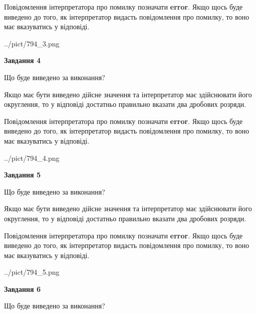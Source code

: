 \documentclass[12pt, ukrainian]{article}
\begin{document}
{\begin {Large}
Повідомлення інтерпретатора про помилку позначати \textbf{error}.
Якщо щось буде виведено до того, як інтерпретатор видасть повідомлення про помилку, 
то воно має вказуватись у відповіді. \par

\begin{center}
	{../pict/794_3.png}
\end{center}
\newpage

{\begin {center}\textbf{Завдання 4}\end {center}}\par
Що буде виведено за виконання? \par

Якщо має бути виведено дійсне значення та інтерпретатор має здійснювати його округлення, 
то у відповіді достатньо правильно вказати два дробових розряди.

Повідомлення інтерпретатора про помилку позначати \textbf{error}.
Якщо щось буде виведено до того, як інтерпретатор видасть повідомлення про помилку, 
то воно має вказуватись у відповіді. \par

\begin{center}
	{../pict/794_4.png}
\end{center}
\newpage

{\begin {center}\textbf{Завдання 5}\end {center}}\par
Що буде виведено за виконання? \par

Якщо має бути виведено дійсне значення та інтерпретатор має здійснювати його округлення, 
то у відповіді достатньо правильно вказати два дробових розряди.

Повідомлення інтерпретатора про помилку позначати \textbf{error}.
Якщо щось буде виведено до того, як інтерпретатор видасть повідомлення про помилку, 
то воно має вказуватись у відповіді. \par

\begin{center}
	{../pict/794_5.png}
\end{center}
\newpage

{\begin {center}\textbf{Завдання 6}\end {center}}\par
Що буде виведено за виконання? \par


\end{Large}}
\end{document}
